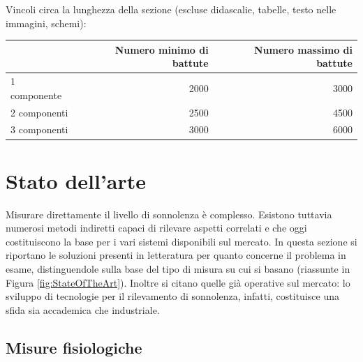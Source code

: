 \documentclass[12pt]{article}
\begin{document}
Vincoli circa la lunghezza della sezione (escluse didascalie, tabelle, testo nelle immagini, schemi):

\vspace{1cm}
\begin{tabular}{l|rr}
	& Numero minimo di battute & Numero massimo di battute \\
	\hline
	1 componente & 2000 & 3000 \\
	2 componenti & 2500 & 4500 \\
	3 componenti & 3000 & 6000 \\
	\hline
\end{tabular}
\fi

\newpage



\section{Stato dell'arte}

Misurare direttamente il livello di sonnolenza è complesso. Esistono tuttavia numerosi metodi indiretti capaci di rilevare aspetti correlati e che oggi costituiscono la base per i vari sistemi disponibili sul mercato.
In questa sezione si riportano le soluzioni presenti in letteratura per quanto concerne il problema in esame, distinguendole sulla base del tipo di misura su cui si basano (riassunte in Figura \ref{fig:StateOfTheArt}). Inoltre si citano quelle già operative sul mercato: lo sviluppo di tecnologie per il rilevamento di sonnolenza, infatti, costituisce una sfida sia accademica che industriale.

\subsection{Misure fisiologiche}
\end{document}
